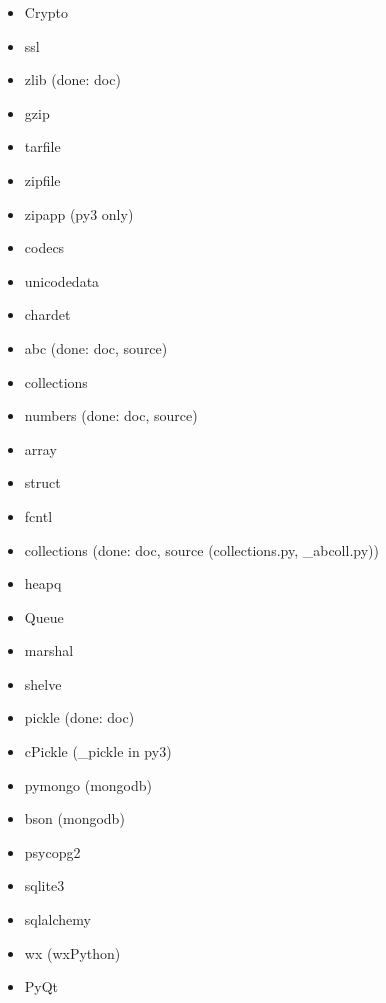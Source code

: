 \documentclass{article}
\begin{document}
\begin{enumerate}
\begin{itemize}
            \item Crypto
            \item ssl

            \item zlib (done: doc)
            \item gzip
            \item tarfile
            \item zipfile
            \item zipapp (py3 only)

            \item codecs
            \item unicodedata
            \item chardet

            \item abc (done: doc, source)
            \item collections
            \item numbers (done: doc, source)

            \item array
            \item struct
            \item fcntl

            \item collections (done: doc, source (collections.py, _abcoll.py))
            \item heapq
            \item Queue

            \item marshal
            \item shelve
            \item pickle (done: doc)
            \item cPickle (_pickle in py3)
            \item pymongo (mongodb)
            \item bson (mongodb)
            \item psycopg2
            \item sqlite3
            \item sqlalchemy

            \item wx (wxPython)
            \item PyQt


\end{itemize}
\end{enumerate}
\end{document}
